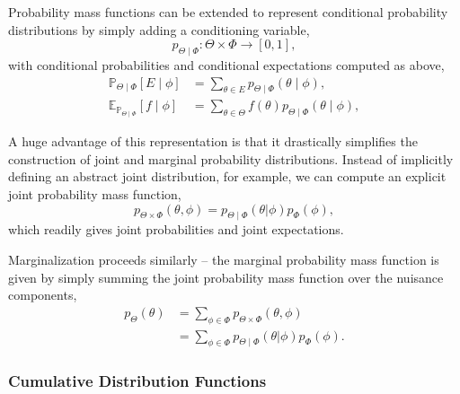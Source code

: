 \documentclass[11pt, oneside]{article}
\newcommand{\PP}{ \mathbb{P} }
\begin{document}
Probability mass functions can be extended to represent conditional probability
distributions by simply adding a conditioning variable,
%
\begin{equation*}
p_{\Theta \mid \Phi} : \Theta \times \Phi \rightarrow \left[0, 1\right],
\end{equation*}
%
with conditional probabilities and conditional expectations computed
as above,
%
\begin{align*}
\PP_{\Theta \mid \Phi}  \! \left[ E \mid \phi \right]
&=
\sum_{\theta \in E} p_{\Theta \mid \Phi}  \! \left( \theta \mid \phi \right),
\\
\mathbb{E}_{\PP_{\Theta \mid \Phi} } \! \left[ f \mid \phi \right]
&=
\sum_{\theta \in \Theta} f \! \left( \theta \right) 
p_{\Theta \mid \Phi}  \! \left( \theta \mid \phi \right),
\end{align*}

A huge advantage of this representation is that it drastically simplifies the
construction of joint and marginal probability distributions.  Instead of implicitly
defining an abstract joint distribution, for example, we can compute an 
explicit joint probability mass function,
%
\begin{equation*}
p_{\Theta \times \Phi} \! \left( \theta, \phi \right) = 
p_{\Theta \mid \Phi} \! \left( \theta | \phi \right) p_{\Phi} \! \left( \phi \right),
\end{equation*}
%
which readily gives joint probabilities and joint expectations.

Marginalization proceeds similarly -- the marginal probability mass function
is given by simply summing the joint probability mass function over the
nuisance components,
%
\begin{align*}
p_{\Theta} \! \left( \theta \right)
&= 
\sum_{\phi \in \Phi}  p_{\Theta \times \Phi} \! \left( \theta, \phi \right) \\
&=
\sum_{\phi \in \Phi}
p_{\Theta \mid \Phi} \! \left( \theta | \phi \right) p_{\Phi} \! \left( \phi \right).
\end{align*}

\subsubsection{Cumulative Distribution Functions}
\end{document}

